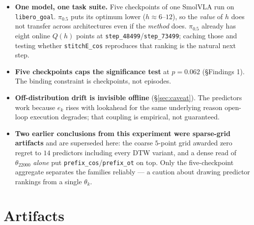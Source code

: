 \documentclass[11pt]{article}
\begin{document}
\begin{itemize}
  \item \textbf{One model, one task suite.} Five checkpoints of one SmolVLA run on
        \texttt{libero\_goal}. $\pi_{0.5}$ puts its optimum lower ($h\approx6$--$12$), so the
        \emph{value} of $h$ does not transfer across architectures even if the \emph{method} does.
        $\pi_{0.5}$ already has eight online $Q(h)$ points at \texttt{step\_48499}/\texttt{step\_73499};
        caching those and testing whether \texttt{stitchE\_cos} reproduces that ranking is the
        natural next step.
  \item \textbf{Five checkpoints caps the significance test} at $p=0.062$ (\S Findings 1). The
        binding constraint is checkpoints, not episodes.
  \item \textbf{Off-distribution drift is invisible offline} (\S\ref{sec:caveat}). The predictors
        work because $e_k$ rises with lookahead for the same underlying reason open-loop execution
        degrades; that coupling is empirical, not guaranteed.
  \item \textbf{Two earlier conclusions from this experiment were sparse-grid artifacts} and are
        superseded here: the coarse $5$-point grid awarded zero regret to $14$ predictors including
        every DTW variant, and a dense read of $\theta_{22000}$ \emph{alone} put
        \texttt{prefix\_cos}/\texttt{prefix\_ot} on top. Only the five-checkpoint aggregate separates
        the families reliably --- a caution about drawing predictor rankings from a single $\theta_k$.
\end{itemize}

\section*{Artifacts}
\end{document}
